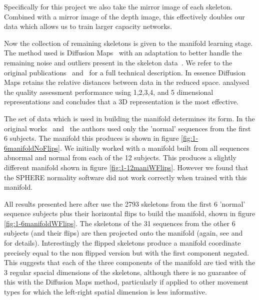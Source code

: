 \documentclass[11pt]{article} %
\begin{document}
Specifically for this project we also take the mirror image of each skeleton. Combined with a mirror image of the depth image, this effectively doubles our data which allows us to train larger capacity networks.

Now the collection of remaining skeletons is given to the manifold learning stage. The method used is Diffusion Maps~\cite{Coifman2006} with an adaptation to better handle the remaining noise and outliers present in the skeleton data~\cite{Paiement}. We refer to the original publications~\cite{Paiement} and~\cite{Tao} for a full technical description. In essence Diffusion Maps retains the relative distances between data in the reduced space. \cite{Tao} analysed the quality assessment performance using 1,2,3,4, and 5 dimensional representations and concludes that a 3D representation is the most effective.

The set of data which is used in building the manifold determines its form. In the original works~\cite{Paiement} and~\cite{Tao} the authors used only the 'normal' sequences from the first 6 subjects. The manifold this produces is shown in figure \ref{fig:1-6manifoldNoFlips}. We initially worked with a manifold built from all sequences abnormal and normal from each of the 12 subjects. This produces a slightly different manifold shown in figure \ref{fig:1-12maniWFlips}. However we found that the SPHERE normality software did not work correctly when trained with this manifold. %

All results presented here after use the 2793 skeletons from the first 6 'normal' sequence subjects plus their horizontal flips to build the manifold, shown in figure \ref{fig:1-6manifoldWFlips}. The skeletons of the 31 sequences from the other 6 subjects (and their flips) are then projected onto the manifold (again, see \cite{Paiement} and~\cite{Tao} for details). Interestingly the flipped skeletons produce a manifold coordinate precisely equal to the non flipped version but with the first component negated. This suggests that each of the three components of the manifold are tied with the 3 regular spacial dimensions of the skeletons, although there is no guarantee of this with the Diffusion Maps method, particularly if applied to other movement types for which the left-right spatial dimension is less informative. 
\end{document}
